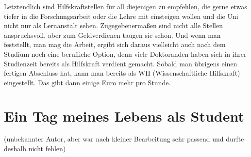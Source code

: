 Letztendlich sind Hilfskraftstellen für all diejenigen zu empfehlen, die gerne etwas tiefer in die Forschungsarbeit oder die Lehre mit einsteigen wollen und die Uni nicht nur als Lernanstalt sehen. Zugegebenermaßen sind nicht alle Stellen anspruchsvoll, aber zum Geldverdienen taugen sie schon. Und wenn man feststellt, man mag die Arbeit, ergibt sich daraus vielleicht auch nach dem Studium noch eine berufliche Option, denn viele Doktoranden haben sich in ihrer Studienzeit bereits als Hilfskraft verdient gemacht. Sobald man übrigens einen fertigen Abschluss hat, kann man bereits als WH (Wissenschaftliche Hilfskraft) eingestellt. Das gibt dann einige Euro mehr pro Stunde. 

\newpage

\section{Ein Tag meines Lebens als Student}
(unbekannter Autor, aber war nach kleiner Bearbeitung sehr passend und durfte deshalb nicht fehlen)\\
